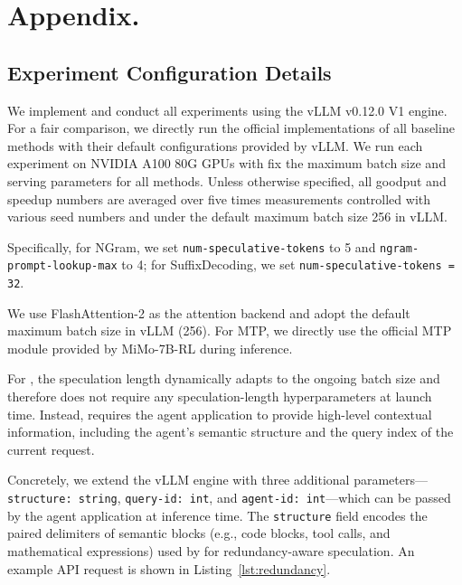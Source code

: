 \newpage
\appendix
\section{Appendix.}
\subsection{Experiment Configuration Details}
\label{appendix:vllm_configration_details}
We implement \sysname and conduct all experiments using the vLLM v0.12.0 V1 engine. For a fair comparison, we directly run the official implementations of all baseline methods with their default configurations provided by vLLM. We run each experiment on NVIDIA A100 80G GPUs with fix the maximum batch size and serving parameters for all methods. Unless otherwise specified, all goodput and speedup numbers are averaged over five times measurements controlled with various seed numbers and under the default maximum batch size 256 in vLLM.

Specifically, for NGram, we set \lstinline|num-speculative-tokens| to 5 and \lstinline|ngram-prompt-lookup-max| to 4; for SuffixDecoding, we set \lstinline|num-speculative-tokens = 32|.

We use FlashAttention-2 as the attention backend and adopt the default maximum batch size in vLLM (256). For MTP, we directly use the official MTP module provided by MiMo-7B-RL during inference.

For \sysname, the speculation length dynamically adapts to the ongoing batch size and therefore does not require any speculation-length hyperparameters at launch time. Instead, \sysname requires the agent application to provide high-level contextual information, including the agent’s semantic structure and the query index of the current request.

Concretely, we extend the vLLM engine with three additional parameters—\lstinline|structure: string|, \lstinline|query-id: int|, and \lstinline|agent-id: int|—which can be passed by the agent application at inference time. The \lstinline|structure| field encodes the paired delimiters of semantic blocks (e.g., code blocks, tool calls, and mathematical expressions) used by \sysname for redundancy-aware speculation. An example API request is shown in Listing~\ref{lst:redundancy}.

